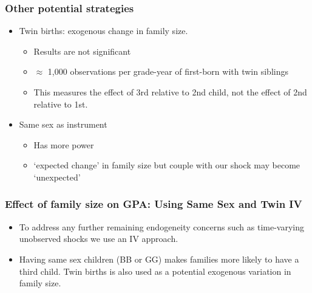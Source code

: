 \documentclass{beamer}
\begin{document}
\begin{frame}
    \label{frame:otherstrategies}
    \frametitle{Other potential strategies}
        \begin{itemize}
            \item Twin births: exogenous change in family size.
            \begin{itemize}
                \item Results are not significant
                \item $\approx$ 1,000 observations per grade-year of first-born with twin siblings
                \item This measures the effect of 3rd relative to 2nd child, not the effect of 2nd relative to 1st.
            \end{itemize}
            \item Same sex as instrument
            \begin{itemize}
                \item Has more power
                \item `expected change' in family size but couple with our shock may become `unexpected'
            \end{itemize}
            
        \end{itemize}
     

\end{frame}


\begin{frame}
    \label{frame:iv_intro}
    \frametitle{Effect of family size on GPA: Using Same Sex and Twin IV}
    \begin{itemize}
        \item To address any further remaining endogeneity concerns such as time-varying unobserved shocks we use an IV approach.
        \item Having same sex children (BB or GG) makes families more likely to have a third child. Twin births is also used as a potential exogenous variation in family size.
    \end{itemize}    
   
\end{frame}
\end{document}
